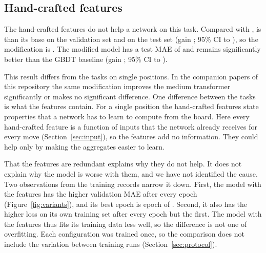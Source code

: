 \documentclass[11pt]{article}
\begin{document}
\ifchangehand
\subsection{Hand-crafted features}
\label{sec:hand}

The hand-crafted features do not help a network on this task.
\ifpairs
Compared with ,  is
 than its
base on the validation set and
 on the test set
(gain ; 95\% CI
 to
), so the
modification is .
\fi
The modified model has a test MAE of 
and remains significantly better than the GBDT baseline (gain
; 95\% CI
 to
).

This result differs from the tasks on single positions. In the companion
papers of this repository the same modification improves the medium
transformer significantly or makes no significant difference. One difference
between the tasks is what the features contain. For a single position the
hand-crafted features state properties that a network has to learn to compute
from the board. Here every hand-crafted feature is a function of inputs that
the network already receives for every move (Section~\ref{sec:input}), so the
features add no information. They could help only by making the aggregates
easier to learn.

That the features are redundant explains why they do not help. It does not
explain why the model is worse with them, and we have not identified the
cause. Two observations from the training records narrow it down. First, the
model with the features has the higher validation MAE after every
epoch\ifvariants{} (Figure~\ref{fig:variants})\fi, and its best epoch is
epoch  of
. Second, it also has the higher loss
on its own training set after every epoch but the first. The model with the
features thus fits its training data less well, so the difference is not one
of overfitting. Each configuration was trained once, so the comparison does
not include the variation between training runs
(Section~\ref{sec:protocol}).
\fi
\end{document}
